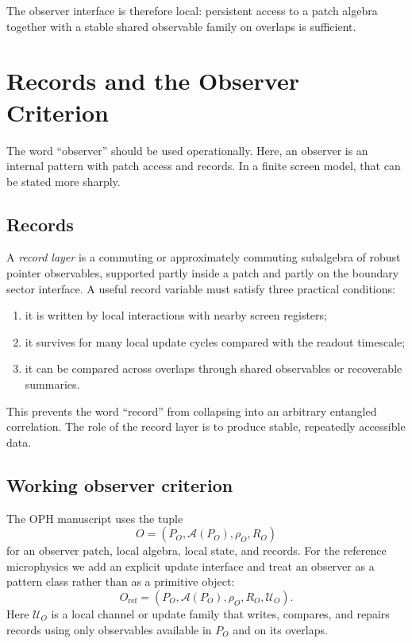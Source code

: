 \documentclass[11pt]{article}
\begin{document}
The observer interface is therefore local: persistent access to a patch algebra together with a
stable shared observable family on overlaps is sufficient.

\section{Records and the Observer Criterion}

The word ``observer'' should be used operationally. Here, an observer is an
internal pattern with patch access and records. In a finite screen model, that can be stated
more sharply.

\subsection{Records}

A \emph{record layer} is a commuting or approximately commuting subalgebra of robust pointer
observables, supported partly inside a patch and partly on the boundary sector interface. A
useful record variable must satisfy three practical conditions:
\begin{enumerate}[leftmargin=2em]
\item it is written by local interactions with nearby screen registers;
\item it survives for many local update cycles compared with the readout timescale;
\item it can be compared across overlaps through shared observables or recoverable summaries.
\end{enumerate}

This prevents the word ``record'' from collapsing into an arbitrary entangled correlation.
The role of the record layer is to produce stable, repeatedly accessible data.

\subsection{Working observer criterion}

The OPH manuscript uses the tuple
\begin{equation}
O=(P_O,\mathcal A(P_O),\rho_O,R_O)
\end{equation}
for an observer patch, local algebra, local state, and records. For the reference
microphysics we add an explicit update interface and treat an observer as a pattern class
rather than as a primitive object:
\begin{equation}
O_{\mathrm{ref}}=(P_O,\mathcal A(P_O),\rho_O,R_O,\mathcal U_O).
\end{equation}
Here $\mathcal U_O$ is a local channel or update family that writes, compares, and repairs
records using only observables available in $P_O$ and on its overlaps.
\end{document}

